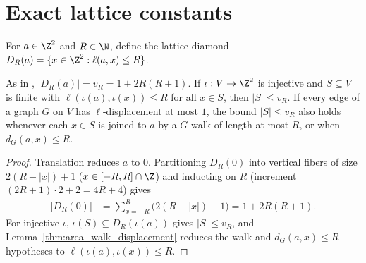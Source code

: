 
\section{Exact lattice constants}

\begin{definition}
    \label{def:area_lattice_diamond}
    \leanok
    For $a\in\Z^2$ and $R\in\N$, define the lattice diamond
    $D_R(a)=\{x\in\Z^2:\ell(a,x)\le R\}$.
\end{definition}

\begin{lemma}
    \label{thm:area_diamond_count}
    \leanok
    As in \cite[Section~2]{OpenAI2026AreaLaw},
    $|D_R(a)|=v_R=1+2R(R+1)$. If $\iota:V\to\Z^2$ is injective and
    $S\subseteq V$ is finite with $\ell(\iota(a),\iota(x))\le R$ for all
    $x\in S$, then $|S|\le v_R$. If every edge of a graph $G$ on $V$ has
    $\ell$-displacement at most $1$, the bound $|S|\le v_R$ also holds
    whenever each $x\in S$ is joined to $a$ by a $G$-walk of length at most
    $R$, or when $d_G(a,x)\le R$.
\end{lemma}
\begin{proof}
    \leanok
    Translation reduces $a$ to $0$. Partitioning $D_R(0)$ into vertical
    fibers of size $2(R-|x|)+1$ ($x\in[-R,R]\cap\Z$) and inducting on $R$
    (increment $(2R+1)\cdot2+2=4R+4$) gives
    \begin{align}
        |D_R(0)| & =\sum_{x=-R}^R\bigl(2(R-|x|)+1\bigr)
        =1+2R(R+1).
        \label{eq:area_diamond_rows}
    \end{align}
    For injective $\iota$, $\iota(S)\subseteq D_R(\iota(a))$ gives
    $|S|\le v_R$, and Lemma~\ref{thm:area_walk_displacement} reduces the
    walk and $d_G(a,x)\le R$ hypotheses to $\ell(\iota(a),\iota(x))\le R$.
\end{proof}

